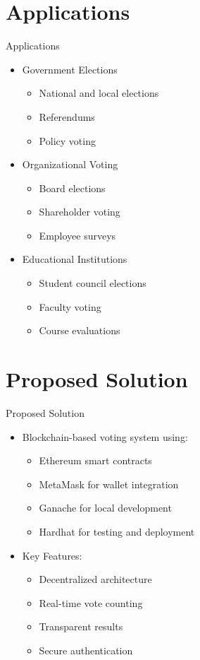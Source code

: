\documentclass{beamer}
\begin{document}
\section{Applications}
\begin{frame}{Applications}
  \begin{itemize}
    \item Government Elections
      \begin{itemize}
        \item National and local elections
        \item Referendums
        \item Policy voting
      \end{itemize}
    \item Organizational Voting
      \begin{itemize}
        \item Board elections
        \item Shareholder voting
        \item Employee surveys
      \end{itemize}
    \item Educational Institutions
      \begin{itemize}
        \item Student council elections
        \item Faculty voting
        \item Course evaluations
      \end{itemize}
  \end{itemize}
\end{frame}

\section{Proposed Solution}
\begin{frame}{Proposed Solution}
  \begin{itemize}
    \item Blockchain-based voting system using:
      \begin{itemize}
        \item Ethereum smart contracts
        \item MetaMask for wallet integration
        \item Ganache for local development
        \item Hardhat for testing and deployment
      \end{itemize}
    \item Key Features:
      \begin{itemize}
        \item Decentralized architecture
        \item Real-time vote counting
        \item Transparent results
        \item Secure authentication
      \end{itemize}
  \end{itemize}
\end{frame}
\end{document}

